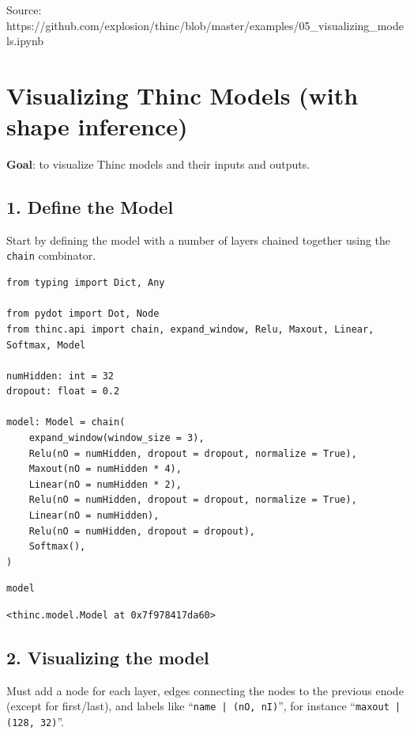 \documentclass[
]{article}
\author{}
\date{}
\begin{document}
Source:
https://github.com/explosion/thinc/blob/master/examples/05\_visualizing\_models.ipynb

\hypertarget{visualizing-thinc-models-with-shape-inference}{%
\section{Visualizing Thinc Models (with shape
inference)}\label{visualizing-thinc-models-with-shape-inference}}

\textbf{Goal}: to visualize Thinc models and their inputs and outputs.

\hypertarget{define-the-model}{%
\subsection{1. Define the Model}\label{define-the-model}}

Start by defining the model with a number of layers chained together
using the \texttt{chain} combinator.

\begin{verbatim}
from typing import Dict, Any

from pydot import Dot, Node
from thinc.api import chain, expand_window, Relu, Maxout, Linear, Softmax, Model

numHidden: int = 32
dropout: float = 0.2

model: Model = chain(
    expand_window(window_size = 3),
    Relu(nO = numHidden, dropout = dropout, normalize = True),
    Maxout(nO = numHidden * 4),
    Linear(nO = numHidden * 2),
    Relu(nO = numHidden, dropout = dropout, normalize = True),
    Linear(nO = numHidden),
    Relu(nO = numHidden, dropout = dropout),
    Softmax(),
)
\end{verbatim}

\begin{verbatim}
model
\end{verbatim}

\begin{verbatim}
<thinc.model.Model at 0x7f978417da60>
\end{verbatim}

\hypertarget{visualizing-the-model}{%
\subsection{2. Visualizing the model}\label{visualizing-the-model}}

Must add a node for each layer, edges connecting the nodes to the
previous enode (except for first/last), and labels like
``\texttt{name | (nO, nI)}'', for instance
``\texttt{maxout | (128, 32)}''.
\end{document}
